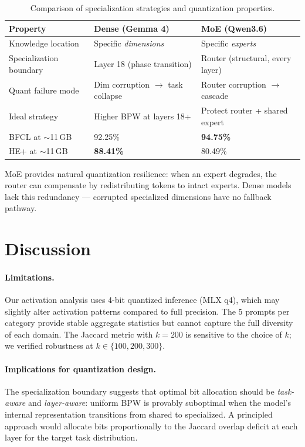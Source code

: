 \documentclass[11pt,a4paper]{article}
\begin{document}
\begin{table}[H]
\centering
\caption{Comparison of specialization strategies and quantization properties.}
\label{tab:densemoe}
\begin{tabular}{lll}
\toprule
\textbf{Property} & \textbf{Dense (Gemma 4)} & \textbf{MoE (Qwen3.6)} \\
\midrule
Knowledge location & Specific \emph{dimensions} & Specific \emph{experts} \\
Specialization boundary & Layer 18 (phase transition) & Router (structural, every layer) \\
Quant failure mode & Dim corruption $\to$ task collapse & Router corruption $\to$ cascade \\
Ideal strategy & Higher BPW at layers 18+ & Protect router + shared expert \\
BFCL at $\sim$11\,GB & 92.25\% & \textbf{94.75\%} \\
HE+ at $\sim$11\,GB & \textbf{88.41\%} & 80.49\% \\
\bottomrule
\end{tabular}
\end{table}

MoE provides natural quantization resilience: when an expert degrades, the router can compensate by redistributing tokens to intact experts. Dense models lack this redundancy --- corrupted specialized dimensions have no fallback pathway.

\section{Discussion}

\paragraph{Limitations.} Our activation analysis uses 4-bit quantized inference (MLX q4), which may slightly alter activation patterns compared to full precision. The 5 prompts per category provide stable aggregate statistics but cannot capture the full diversity of each domain. The Jaccard metric with $k=200$ is sensitive to the choice of $k$; we verified robustness at $k \in \{100, 200, 300\}$.

\paragraph{Implications for quantization design.} The specialization boundary suggests that optimal bit allocation should be \emph{task-aware} and \emph{layer-aware}: uniform BPW is provably suboptimal when the model's internal representation transitions from shared to specialized. A principled approach would allocate bits proportionally to the Jaccard overlap deficit at each layer for the target task distribution.
\end{document}
